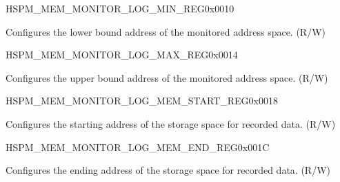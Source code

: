 \begin{register}{H}{SPM\_MEM\_MONITOR\_LOG\_MIN\_REG}{0x0010}\label{regdesc:SPMMEMMONITORLOGMINREG}
%
\regnewline%
\begin{regdesc}\begin{reglist}
\label{fielddesc:SPMMEMMONITORLOGMIN}\item [SPM\_MEM\_MONITOR\_LOG\_MIN] Configures the lower bound address of the monitored address space. (R/W)
\end{reglist}\end{regdesc}
\end{register}


\begin{register}{H}{SPM\_MEM\_MONITOR\_LOG\_MAX\_REG}{0x0014}\label{regdesc:SPMMEMMONITORLOGMAXREG}
%
\regnewline%
\begin{regdesc}\begin{reglist}
\label{fielddesc:SPMMEMMONITORLOGMAX}\item [SPM\_MEM\_MONITOR\_LOG\_MAX] Configures the upper bound address of the monitored address space. (R/W)
\end{reglist}\end{regdesc}
\end{register}


\begin{register}{H}{SPM\_MEM\_MONITOR\_LOG\_MEM\_START\_REG}{0x0018}\label{regdesc:SPMMEMMONITORLOGMEMSTARTREG}
%
\regnewline%
\begin{regdesc}\begin{reglist}
\label{fielddesc:SPMMEMMONITORLOGMEMSTART}\item [SPM\_MEM\_MONITOR\_LOG\_MEM\_START] Configures the starting address of the storage space for recorded data. (R/W)
\end{reglist}\end{regdesc}
\end{register}


\begin{register}{H}{SPM\_MEM\_MONITOR\_LOG\_MEM\_END\_REG}{0x001C}\label{regdesc:SPMMEMMONITORLOGMEMENDREG}
%
\regnewline%
\begin{regdesc}\begin{reglist}
\label{fielddesc:SPMMEMMONITORLOGMEMEND}\item [SPM\_MEM\_MONITOR\_LOG\_MEM\_END] Configures the ending address of the storage space for recorded data. (R/W)
\end{reglist}\end{regdesc}
\end{register}


